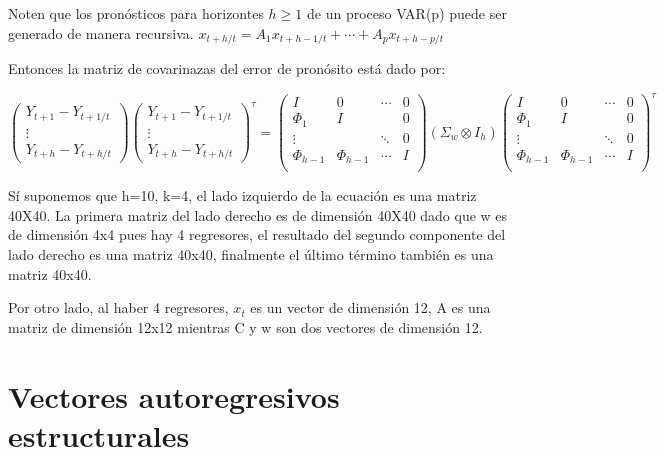 \documentclass[
]{book}
\begin{document}
Noten que los pronósticos para horizontes \(h\geq1\) de un proceso VAR(p) puede ser generado de manera recursiva.
\(x_{t+h/t} = A_{1}x_{t+h-1/t} + \cdots+A_{p}x_{t+h-p/t}\)

Entonces la matriz de covarinazas del error de pronósito está dado por:

\begin{equation}
\left( \begin{array}{c}
Y_{t+1}-Y_{t+1/t} \\
\vdots \\
Y_{t+h}-Y_{t+h/t}
\end{array}
\right)
\left( \begin{array}{c}
Y_{t+1}-Y_{t+1/t} \\
\vdots \\
Y_{t+h}-Y_{t+h/t}
\end{array}
\right)^{\tau}
=\left( \begin{array}{cccc}
I      & 0  & \cdots & 0\\
\Phi_1 & I  &        & 0\\
\vdots &    & \ddots & 0\\
\Phi_{h-1} & \Phi_{h-1}   & \cdots & I\\
\end{array}
\right) \left(\Sigma_{w}\otimes I_{h}\right)\left( \begin{array}{cccc}
I      & 0  & \cdots & 0\\
\Phi_1 & I  &        & 0\\
\vdots &    & \ddots & 0\\
\Phi_{h-1} & \Phi_{h-1}   & \cdots & I\\
\end{array}
\right)^{\tau}
\nonumber
\end{equation}

Sí suponemos que h=10, k=4, el lado izquierdo de la ecuación es una matriz 40X40. La primera matriz del lado derecho es de dimensión 40X40 dado que w es de dimensión 4x4 pues hay 4 regresores, el resultado del segundo componente del lado derecho es una matriz 40x40, finalmente el último término también es una matriz 40x40.

Por otro lado, al haber 4 regresores, \(x_{t}\) es un vector de dimensión 12, A es una matriz de dimensión 12x12 mientras C y w son dos vectores de dimensión 12.

\hypertarget{vectores-autoregresivos-estructurales}{%
\section{Vectores autoregresivos estructurales}\label{vectores-autoregresivos-estructurales}}
\end{document}
